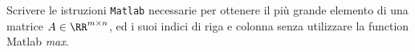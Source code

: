 Scrivere le istruzioni {\tt Matlab} necessarie per ottenere il pi\`u
grande elemento di una matrice $A\in \RR^{m\times n}$, ed i suoi indici di riga e colonna senza utilizzare la function Matlab \textit{max}.

